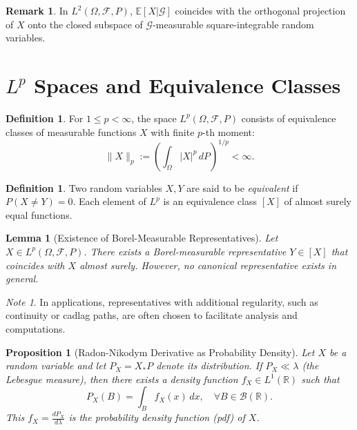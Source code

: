 \documentclass[11pt,reqno]{amsart}
\newtheorem{lemma}[theorem]{Lemma}
\newtheorem{proposition}[theorem]{Proposition}
\theoremstyle{definition}
\newtheorem{definition}[theorem]{Definition}
\newtheorem{remark}[theorem]{Remark}
\theoremstyle{remark}
\newtheorem*{note}{Note}
\begin{document}
\begin{remark}
	In $L^2(\Omega, \mathcal{F}, P)$, $\mathbb{E}[X|\mathcal{G}]$ coincides with the orthogonal projection of $X$ onto the closed subspace of $\mathcal{G}$-measurable square-integrable random variables.
\end{remark}

\section{\texorpdfstring{$L^p$}{Lp} Spaces and Equivalence Classes}

\begin{definition}
	For $1 \leq p < \infty$, the space $L^p(\Omega, \mathcal{F}, P)$ consists of equivalence classes of measurable functions $X$ with finite $p$-th moment:
	\[
		\|X\|_p := \left( \int_\Omega |X|^p \, dP \right)^{1/p} < \infty.
	\]
\end{definition}

\begin{definition}
	Two random variables $X, Y$ are said to be \emph{equivalent} if $P(X \neq Y)=0$. Each element of $L^p$ is an equivalence class $[X]$ of almost surely equal functions.
\end{definition}

\begin{lemma}[Existence of Borel-Measurable Representatives]
	Let $X \in L^p(\Omega, \mathcal{F}, P)$. There exists a Borel-measurable representative $Y \in [X]$ that coincides with $X$ almost surely. However, no canonical representative exists in general.
\end{lemma}

\begin{note}
	In applications, representatives with additional regularity, such as continuity or cadlag paths, are often chosen to facilitate analysis and computations.
\end{note}

\begin{proposition}[Radon-Nikodym Derivative as Probability Density]
	Let $X$ be a random variable and let $P_X = X_*P$ denote its distribution. If $P_X \ll \lambda$ (the Lebesgue measure), then there exists a density function $f_X \in L^1(\mathbb{R})$ such that
	\[
		P_X(B) = \int_B f_X(x) \, dx, \quad \forall B \in \mathcal{B}(\mathbb{R}).
	\]
	This $f_X = \frac{dP_X}{d\lambda}$ is the \emph{probability density function} (pdf) of $X$.
\end{proposition}
\end{document}
